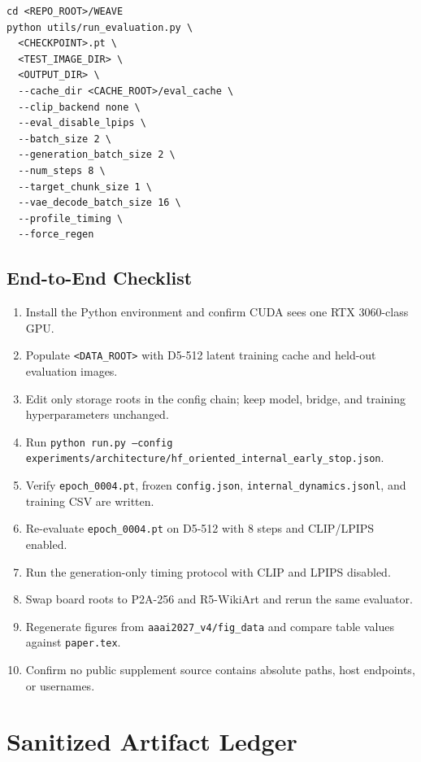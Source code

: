 \documentclass[10pt,twocolumn]{article}
\begin{document}
\begin{lstlisting}[style=cmd,caption={Generation-only timing protocol}]
cd <REPO_ROOT>/WEAVE
python utils/run_evaluation.py \
  <CHECKPOINT>.pt \
  <TEST_IMAGE_DIR> \
  <OUTPUT_DIR> \
  --cache_dir <CACHE_ROOT>/eval_cache \
  --clip_backend none \
  --eval_disable_lpips \
  --batch_size 2 \
  --generation_batch_size 2 \
  --num_steps 8 \
  --target_chunk_size 1 \
  --vae_decode_batch_size 16 \
  --profile_timing \
  --force_regen
\end{lstlisting}

\subsection{End-to-End Checklist}

\begin{enumerate}[leftmargin=1.6em,itemsep=0.2em]
  \item Install the Python environment and confirm CUDA sees one RTX 3060-class GPU.
  \item Populate \texttt{<DATA\_ROOT>} with D5-512 latent training cache and held-out
  evaluation images.
  \item Edit only storage roots in the config chain; keep model, bridge, and training
  hyperparameters unchanged.
  \item Run \texttt{python run.py --config experiments/architecture/hf\_oriented\_internal\_early\_stop.json}.
  \item Verify \texttt{epoch\_0004.pt}, frozen \texttt{config.json},
  \texttt{internal\_dynamics.jsonl}, and training CSV are written.
  \item Re-evaluate \texttt{epoch\_0004.pt} on D5-512 with 8 steps and CLIP/LPIPS
  enabled.
  \item Run the generation-only timing protocol with CLIP and LPIPS disabled.
  \item Swap board roots to P2A-256 and R5-WikiArt and rerun the same evaluator.
  \item Regenerate figures from \texttt{aaai2027\_v4/fig\_data} and compare table values
  against \texttt{paper.tex}.
  \item Confirm no public supplement source contains absolute paths, host endpoints, or
  usernames.
\end{enumerate}

\section{Sanitized Artifact Ledger}
\end{document}
